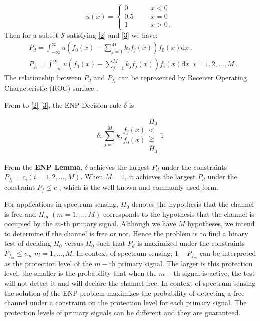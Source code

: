 \documentclass[12pt,journal,a4paper,twoside,onecolumn]{IEEEtran}
\begin{document}
\begin{spacing}{2.5}
\begin{equation}
   \label{equ: step function}
   u(x) = \begin{cases}
     0\;\;\;\;\;\;&x < 0\\
     0.5\;\;\;\;\;\;&x=0\\
     1\;\;\;\;\;\;&x>0\,,
   \end{cases}
\end{equation}
Then for a subset $\mathcal{S}$ satisfying \eqref{2} and \eqref{3} we have:
\begin{equation}
\label{equ: pf and pd}
\begin{split}
&P_d = \int_{-\infty}^{\infty} u(f_0(x) - \sum_{j=1}^{M}k_jf_j(x)) f_0(x)\mathrm{d}x	\,, \\
&P_{f_i} = \int_{-\infty}^{\infty} u(f_0(x) - \sum_{j=1}^{M}k_jf_j(x)) f_i(x) \mathrm{d}x\;\;	 i=1, 2, ..., M\,.
\end{split}
\end{equation}
The relationship between $P_d$ and $P_{f_i}$ can be represented by Receiver Operating Characteristic (ROC) surface \cite{LehmannTest}.

From to \eqref{2} \eqref{3}, the ENP Decision rule $\delta$ is

\begin{equation}
\label{equ: decision rule}
\delta: \sum_{j=1}^{M}k_j\frac{f_j(x)}{f_0(x)} \substack{H_0 \\ < \\ \geq \\ \bar{H}_0} 1
\end{equation}

From the  \textbf{ENP Lemma}, $\delta$  achieves the largest $P_d$ under the constraints $P_{f_i} = c_i (i = 1, 2, ..., M)$.
When $M=1$, it achieves the largest $P_d$ under the constraint $P_f \leq c$ \cite{LehmannTest}, which is the well known and commonly used form.

For applications in spectrum sensing, $H_0$ denotes the hypothesis that the channel is free and $H_m \;(m=1, ..., M)$ corresponds to the hypothesis that the channel is occupied by the $m$-th primary signal. Although we have $M$ hypotheses, we intend to determine if the channel is free or not. Hence the problem is to find a binary test of deciding $H_0$ versus $\bar{H}_0$ such that $P_d$ is maximized under the constraints $P_{f_m} \leq c_m$ $m = 1, ..., M$. In context of spectrum sensing, $1-P_{f_m}$ can be interpreted as the protection level of the $m-$th primary signal. The larger is this protection level, the smaller is the probability that when the $m-$th signal is active, the test will not detect it and will declare the channel free. In context of spectrum sensing the solution of the ENP problem maximizes the probability of detecting a free channel under a constraint on the protection level for each primary signal. The protection levels of primary signals can be different and they are guaranteed.


\end{spacing}
\end{document}
